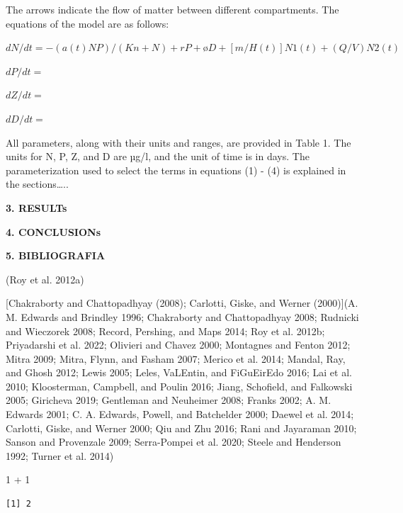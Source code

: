 \documentclass[
  letterpaper,
  DIV=11,
  numbers=noendperiod]{scrartcl}
\newenvironment{Shaded}{\begin{snugshade}}{\end{snugshade}}
\newcommand{\DecValTok}[1]{\textcolor[rgb]{0.68,0.00,0.00}{#1}}
\newcommand{\SpecialCharTok}[1]{\textcolor[rgb]{0.37,0.37,0.37}{#1}}
\begin{document}
The arrows indicate the flow of matter between different compartments.
The equations of the model are as follows:

\(dN/dt= - (a(t)NP)/(Kn+N) + rP + øD + [m/H(t)]N1 (t) + (Q/V)N2(t)\)

\(dP/dt=\)

\(dZ/dt=\)

\(dD/dt=\)

All parameters, along with their units and ranges, are provided in Table
1. The units for N, P, Z, and D are µg/l, and the unit of time is in
days. The parameterization used to select the terms in equations (1) -
(4) is explained in the sections\ldots..

\textbf{3. RESULTs}

\textbf{4. CONCLUSIONs}

\textbf{5. BIBLIOGRAFIA}

(Roy et al. 2012a)

{[}Chakraborty and Chattopadhyay (2008); Carlotti, Giske, and Werner
(2000){]}(A. M. Edwards and Brindley 1996; Chakraborty and Chattopadhyay
2008; Rudnicki and Wieczorek 2008; Record, Pershing, and Maps 2014; Roy
et al. 2012b; Priyadarshi et al. 2022; Olivieri and Chavez 2000;
Montagnes and Fenton 2012; Mitra 2009; Mitra, Flynn, and Fasham 2007;
Merico et al. 2014; Mandal, Ray, and Ghosh 2012; Lewis 2005; Leles,
VaLEntin, and FiGuEirEdo 2016; Lai et al. 2010; Kloosterman, Campbell,
and Poulin 2016; Jiang, Schofield, and Falkowski 2005; Giricheva 2019;
Gentleman and Neuheimer 2008; Franks 2002; A. M. Edwards 2001; C. A.
Edwards, Powell, and Batchelder 2000; Daewel et al. 2014; Carlotti,
Giske, and Werner 2000; Qiu and Zhu 2016; Rani and Jayaraman 2010;
Sanson and Provenzale 2009; Serra-Pompei et al. 2020; Steele and
Henderson 1992; Turner et al. 2014)

\begin{Shaded}
\begin{Highlighting}[]
\DecValTok{1} \SpecialCharTok{+} \DecValTok{1}
\end{Highlighting}
\end{Shaded}

\begin{verbatim}
[1] 2
\end{verbatim}
\end{document}
